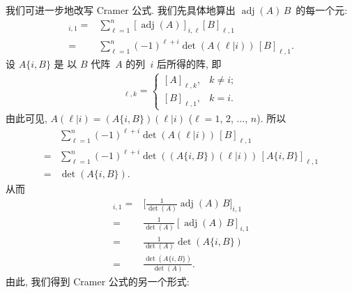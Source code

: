 我们可进一步地改写 Cramer 公式.
我们先具体地算出
\(\operatorname{adj} {(A)}\,B\)~的每一个元:
\begin{align*}
    [\operatorname{adj} {(A)}\,B]_{i,1}
    = {} &
    \sum_{\ell = 1}^{n}
    {[\operatorname{adj} {(A)}]_{i,\ell} [B]_{\ell,1}}
    \\
    = {} &
    \sum_{\ell = 1}^{n}
    {(-1)^{\ell+i} \det {(A(\ell|i))}\, [B]_{\ell,1}}.
\end{align*}
设 \(A \{i, B\}\) 是%
以 \(B\) 代阵~\(A\) 的列~\(i\) 后所得的阵,
即
\begin{align*}
    [A \{i, B\}]_{\ell,k}
    = \begin{cases}
          [A]_{\ell,k}, & k \neq i; \\
          [B]_{\ell,1}, & k = i.
      \end{cases}
\end{align*}
由此可见,
\(A(\ell|i) = (A \{i, B\})(\ell|i)\)
(\(\ell = 1\), \(2\), \(\dots\), \(n\)).
所以
\begin{align*}
         &
    \sum_{\ell = 1}^{n}
    {(-1)^{\ell+i} \det {(A(\ell|i))}\, [B]_{\ell,1}}
    \\
    = {} &
    \sum_{\ell = 1}^{n}
    {(-1)^{\ell+i} \det {((A \{i, B\})(\ell|i))}\,
    [A \{i, B\}]_{\ell,1}}
    \\
    = {} &
    \det {(A \{i, B\})}.
\end{align*}
从而
\begin{align*}
    [X]_{i,1}
    = {} &
    \Big[ \frac{1}{\det {(A)}}
        \operatorname{adj} {(A)}\,B \Big]_{i,1}
    \\
    = {} &
    \frac{1}{\det {(A)}}
    [ \operatorname{adj} {(A)}\,B ]_{i,1}
    \\
    = {} &
    \frac{1}{\det {(A)}}
    \det {(A \{i, B\})}
    \\
    = {} &
    \frac{\det {(A \{i, B\})}}{\det {(A)}}.
\end{align*}
由此, 我们得到 Cramer 公式的另一个形式:

